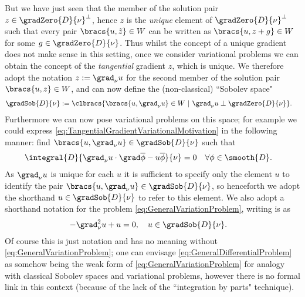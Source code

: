 But we have just seen that the member of the solution pair $z\in\gradZero{D}{\nu}^{\perp}$, hence $z$ is the \textit{unique} element of $\gradZero{D}{\nu}^{\perp}$ such that every pair $\bracs{u,\tilde{z}}\in W$ can be written as $\bracs{u,z+g}\in W$ for some $g\in\gradZero{D}{\nu}$.
Thus whilst the concept of a unique gradient does not make sense in this setting, once we consider variational problems we can obtain the concept of the \textit{tangential} gradient $z$, which is unique.
We therefore adopt the notation $z := \grad_\nu u$ for the second member of the solution pair $\bracs{u,z}\in W$, and can now define the (non-classical) ``Sobolev space"
\begin{align*}
	\gradSob{D}{\nu} &:= \clbracs{\bracs{u,\grad_\nu u}\in W \ \vert \ \grad_\nu u \perp \gradZero{D}{\nu}}.
\end{align*}
Furthermore we can now pose variational problems on this space; for example we could express \eqref{eq:TangentialGradientVariationalMotivation} in the following manner: find $\bracs{u,\grad_\nu u}\in\gradSob{D}{\nu}$ such that
\begin{align} \label{eq:GeneralVariationProblem}
	\integral{D}{\grad_\nu u \cdot \grad\overline{\phi} - u\overline{\phi}}{\nu} &= 0 \quad \forall\phi\in\smooth{D}.
\end{align}
As $\grad_\nu u$ is unique for each $u$ it is sufficient to specify only the element $u$ to identify the pair $\bracs{u,\grad_\nu u}\in\gradSob{D}{\nu}$, so henceforth we adopt the shorthand $u\in\gradSob{D}{\nu}$ to refer to this element.
We also adopt a shorthand notation for the problem \eqref{eq:GeneralVariationProblem}, writing is as
\begin{align} \label{eq:GeneralDifferentialProblem}
	-\grad_\nu^2 u + u &= 0, \quad u\in\gradSob{D}{\nu}.
\end{align}
Of course this is just notation and has no meaning without \eqref{eq:GeneralVariationProblem}; one can envisage \eqref{eq:GeneralDifferentialProblem} as somehow being the weak form of \eqref{eq:GeneralVariationProblem} for analogy with classical Sobolev spaces and variational problems, however there is no formal link in this context (because of the lack of the ``integration by parts" technique). \newline


